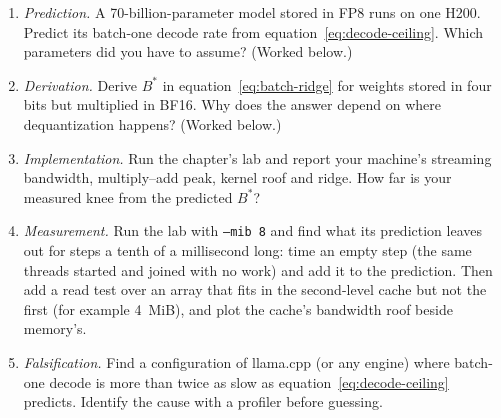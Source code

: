 \ExercisesSection

\begin{enumerate}
\item \emph{Prediction.} A 70-billion-parameter model stored in FP8 runs on
one H200. Predict its batch-one decode rate from
equation~\eqref{eq:decode-ceiling}. Which parameters did you have to assume?
(Worked below.)
\item \emph{Derivation.} Derive $B^{*}$ in equation~\eqref{eq:batch-ridge}
for weights stored in four bits but multiplied in BF16. Why does the answer
depend on where dequantization happens? (Worked below.)
\item \emph{Implementation.} Run the chapter's lab and report your machine's
streaming bandwidth, multiply--add peak, kernel roof and ridge. How far is your
measured knee from the predicted $B^{*}$?
\item \emph{Measurement.} Run the lab with \texttt{--mib 8} and find what its
prediction leaves out for steps a tenth of a millisecond long: time an empty
step (the same threads started and joined with no work) and add it to the
prediction. Then add a read test over an array that fits in the second-level
cache but not the first (for example 4~MiB), and plot the cache's bandwidth roof
beside memory's.
\item \emph{Falsification.} Find a configuration of llama.cpp (or any engine)
where batch-one decode is more than twice as slow as
equation~\eqref{eq:decode-ceiling} predicts. Identify the cause with a
profiler before guessing.
\end{enumerate}


